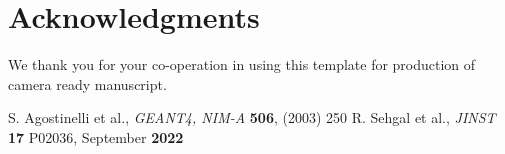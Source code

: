 \documentclass[twocolumn,amsmath,amssymb]{snp}
\begin{document}

\section*{Acknowledgments}
 We thank you for your co-operation in using this template  for production of camera ready manuscript.

\begin{thebibliography}{50}
 S. Agostinelli et al., \emph{GEANT4, NIM-A} {\bf 506}, (2003) 250
 R. Sehgal et al., \emph{JINST} {\bf 17} P02036,  September {\bf 2022}
\end{thebibliography}
\end{document}
